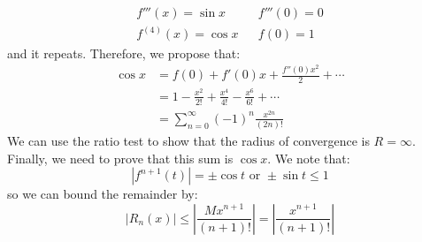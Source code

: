 \begin{itemize}
\begin{example}
\begin{align}
            f'''(x) = \sin x && f'''(0)= 0 \\ 
            f^{(4)}(x) = \cos x && f(0) = 1
        \end{align}
        and it repeats. Therefore, we propose that:
        \begin{align}
            \cos x &= f(0)+f'(0)x+\frac{f''(0)x^2}{2}+\cdots \\ 
            &= 1-\frac{x^2}{2!}+\frac{x^4}{4!}-\frac{x^6}{6!}+\cdots \\ 
            &= \sum_{n=0}^\infty (-1)^n \frac{x^{2n}}{(2n)!}
        \end{align}
        We can use the ratio test to show that the radius of convergence is $R=\infty$. Finally, we need to prove that this sum is $\cos x$. We note that:
        \begin{equation}
            |f^{n+1}(t)| = \pm \cos t \text{ or } \pm \sin t \le 1
        \end{equation}
        so we can bound the remainder by:
        \begin{equation}
            |R_n(x)| \le \left|\frac{Mx^{n+1}}{(n+1)!}\right| = \left|\frac{x^{n+1}}{(n+1)!}\right|
        \end{equation}
    \end{example}
\end{itemize}